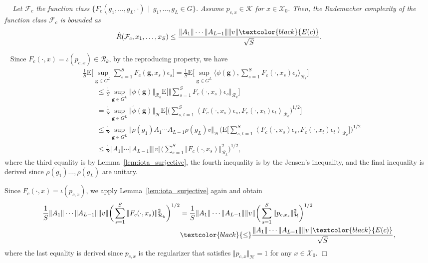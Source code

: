 \documentclass[twoside]{article}
\newenvironment{proof}[1][Proof\ ]{\medskip\noindent{\bf #1}\ }{%
\hfill $\Box$\par\quad\par}
\def\mcl#1{\mathcal{#1}}
\def\bracket#1{\left\langle #1\right\rangle}
\def\hil{\mcl{H}}
\def\nn{\nonumber}
\def\mr{\mathrm}
\def\Bbracket#1{\bigg\langle #1\bigg\rangle}
\def\bg{\mathbf{g}}
\def\red#1{\textcolor{black}{#1}}
\newenvironment{mythm}[1][]{\medskip\par\noindent{\bfseries #1}\ \,\,\em}{\medskip\par}
\begin{document}
\begin{mythm}[Theorem~\ref{thm:rademacher_unitary}]
Let $\mcl{F}_c$ the function class $\{F_c(g_1,\ldots,g_L,\cdot)\,\mid\, g_1,\ldots,g_L\in G\}$.
Assume $p_{c,x}\in\mcl{K}$ for $x\in \mcl{X}_0$. Then, the Rademacher complexity of the function class $\mcl{F}_c$ is bounded as
\begin{align*}
\hat{R}(\mcl{F}_c,x_1,\ldots,x_S)\le\frac{\Vert A_1\Vert\cdots \Vert A_{L-1}\Vert\Vert v\Vert\red{E(c)}}{\sqrt{S}}.
\end{align*}    
\end{mythm}
\begin{proof}
Since $F_c(\cdot,x)=\iota(p_{c,x})\in\mcl{R}_k$, by the reproducing property, we have 
 \begin{align}
 &\frac{1}{S}\mr{E}\bigg[\sup_{\bg \in G^L} \sum_{s=1}^S F_c(\bg, x_s) \epsilon_s\bigg ]
 =\frac{1}{S}\mr{E}\bigg[\sup_{\bg \in G^L}  \Bbracket{\phi(\bg),\sum_{s=1}^SF_c(\cdot, x_s) \epsilon_s}_{\mcl{R}_k}\bigg ]\nn\\
 &\qquad \le \frac{1}{S}\sup_{\bg \in G^L}  \Vert\phi(\bg)\Vert_{\mcl{R}_k}\mr{E}\bigg[\bigg\Vert \sum_{s=1}^SF_c(\cdot, x_s) \epsilon_s\bigg\Vert_{\mcl{R}_k}\bigg]\nn\\
 &\qquad =\frac{1}{S}\sup_{\bg \in G^L}  \Vert\tilde{\phi}(\bg)\Vert_{\hil}\mr{E}\bigg[\bigg(\sum_{s,t=1}^S\bracket{F_c(\cdot, x_s) \epsilon_s,F_c(\cdot, x_t) \epsilon_t}_{\mcl{R}_k}\bigg)^{1/2}\bigg]\nn\\
 &\qquad \le \frac{1}{S}\sup_{\bg \in G^L}  \Vert\rho(g_1)A_1\cdots A_{L-1}\rho(g_L)v\Vert_{\hil}\bigg(\mr{E}\bigg[\sum_{s,t=1}^S\bracket{F_c(\cdot, x_s) \epsilon_s,F_c(\cdot, x_t) \epsilon_t}_{\mcl{R}_k}\bigg]\bigg)^{1/2}\nn\\
 &\qquad\le \frac{1}{S}\Vert A_1\Vert\cdots \Vert A_{L-1}\Vert\Vert v\Vert \bigg(\sum_{s=1}^S\Vert F_c(\cdot,x_s)\Vert_{\mcl{R}_k}^2\bigg)^{1/2},\label{eq:bound_basic}
 \end{align}
where the third equality is by Lemma~\ref{lem:iota_surjective}, the fourth inequality is by the Jensen's inequality, and the final inequality is derived since $\rho(g_1)\ldots,\rho(g_L)$ are unitary.

Since $F_c(\cdot,x)=\iota(p_{c,x})$, we apply Lemma~\ref{lem:iota_surjective} again and obtain 
\begin{align*}
\frac{1}{S}\Vert A_1\Vert\cdots \Vert A_{L-1}\Vert\Vert v\Vert \bigg(\sum_{s=1}^S\Vert F_c(\cdot,x_s)\Vert_{\mcl{R}_k}^2\bigg)^{1/2}
 &=\frac{1}{S}\Vert A_1\Vert\cdots \Vert A_{L-1}\Vert\Vert v\Vert \bigg(\sum_{s=1}^S\Vert p_{c,x_s}\Vert_{\mcl{H}}^2\bigg)^{1/2}\\
 &\red{\le}\frac{\Vert A_1\Vert\cdots \Vert A_{L-1}\Vert\Vert v\Vert \red{E(c)}}{\sqrt{S}},    
\end{align*}
where the last equality is derived since $p_{c,x}$ is the regularizer that satisfies $\Vert p_{c,x}\Vert_{\hil}=1$ for any $x\in\mcl{X}_0$.
\end{proof}
\end{document}
